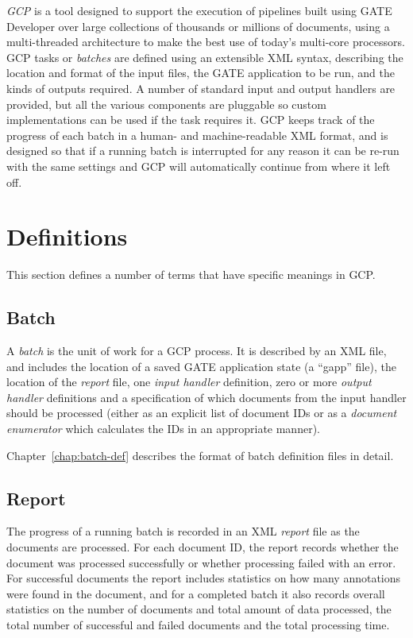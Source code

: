 {\em GCP} is a tool designed to support the execution of pipelines built using
GATE Developer over large collections of thousands or millions of documents,
using a multi-threaded architecture to make the best use of today's multi-core
processors.  GCP tasks or {\em batches} are defined using an extensible XML
syntax, describing the location and format of the input files, the GATE
application to be run, and the kinds of outputs required.  A number of standard
input and output handlers are provided, but all the various components are
pluggable so custom implementations can be used if the task requires it.
GCP keeps track of the progress of each batch in a human- and machine-readable
XML format, and is designed so that if a running batch is interrupted for any
reason it can be re-run with the same settings and GCP will automatically
continue from where it left off.

\section{Definitions}\label{sec:intro:definitions}

This section defines a number of terms that have specific meanings in GCP.

\subsection*{Batch}

A {\em batch} is the unit of work for a GCP process.  It is described by an XML
file, and includes the location of a saved GATE application state (a ``gapp''
file), the location of the {\em report} file, one {\em input handler}
definition, zero or more {\em output handler} definitions and a specification
of which documents from the input handler should be processed (either as an
explicit list of document IDs or as a {\em document enumerator} which
calculates the IDs in an appropriate manner).

Chapter~\ref{chap:batch-def} describes the format of batch definition files in
detail.

\subsection*{Report}

The progress of a running batch is recorded in an XML {\em report} file as the
documents are processed.  For each document ID, the report records whether the
document was processed successfully or whether processing failed with an error.
For successful documents the report includes statistics on how many annotations
were found in the document, and for a completed batch it also records overall
statistics on the number of documents and total amount of data processed, the
total number of successful and failed documents and the total processing time.

